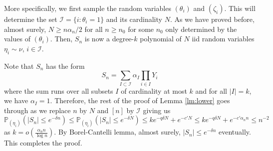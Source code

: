 \documentclass[12pt, reqno]{amsart}
\theoremstyle{plain}
\theoremstyle{definition}
\renewcommand\P{{\mathbb{P}}}
\begin{document}
 More specifically, we first sample the random variables $(\theta_i)$ and $(\zeta_i)$. This will determine the set $\mathcal I=\{i: \theta_i=1\}$ and its cardinality $N$. As we have proved before, almost surely, $N\ge n\alpha_n/2$ for all $n\ge n_0$ for some $n_0$ only determined by the values of $(\theta_i)$. Then, $S_n$ is now a degree-$k$ polynomial of $N$ iid random variables $\eta_i\sim \nu$, $i\in \mathcal I$. 
 
 Note that $S_n$ has the form
 $$S_n  = \sum_{I\subset \mathcal I} \alpha_I \prod_{i\in I} Y_i$$
 where the sum runs over all subsets $I$ of cardinality at most $k$ and for all $|I| = k$, we have $\alpha_I = 1$. Therefore, the rest of the proof of Lemma \ref{lm:lower} goes through as we replace $n$ by $N$ and $[n]$ by $\mathcal I$ giving us
 $$\P_{(\eta_i)}(|S_n|\le e^{-\delta n})\le \P_{(\eta_i)}(|S_n|\le e^{-\delta N}) \le  k e^{-q\delta N}+ e^{-c' N}\le k e^{-q\delta N} + e^{-c'\alpha_n n}\le n^{-2}$$
 as $k = o(\frac{\alpha_n n}{\log n})$. 
 By Borel-Cantelli lemma, almost surely, $|S_n|\le e^{-\delta n}$ eventually. This completes the proof.
 
\end{document}
